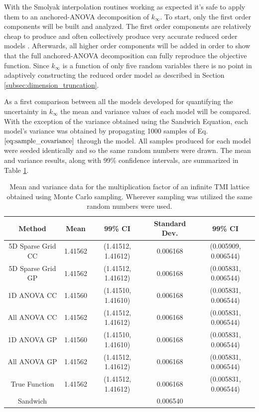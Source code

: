 With the Smolyak interpolation routines working as expected it's safe to apply them to an anchored-\ac{ANOVA} decomposition of $k_{\infty}$. To start, only the first order components will be built and analyzed. The first order components are relatively cheap to produce and often collectively produce very accurate reduced order models \cite{AHSGC_HighDimensions}. Afterwards, all higher order components will be added in order to show that the full anchored-\ac{ANOVA} decomposition can fully reproduce the objective function. Since $k_{\infty}$ is a function of only five random variables there is no point in adaptively constructing the reduced order model as described in Section \ref{subsec:dimension_truncation}.        

As a first comparison between all the models developed for quantifying the uncertainty in $k_{\infty}$ the mean and variance values of each model will be compared. With the exception of the variance obtained using the Sandwich Equation, each model's variance was obtained by propagating 1000 samples of Eq. $\ref{eq:sample_covariance}$ through the model. All samples produced for each model were seeded identically and so the same random numbers were drawn. The mean and variance results, along with 99\% confidence intervals, are summarized in Table \ref{table:kinf_mean_variance}. 
    
\begin{table} 
\caption{\label{table:kinf_mean_variance} 
Mean and variance data for the multiplication factor of an infinite TMI lattice obtained using Monte Carlo sampling. Wherever sampling was utilized the same random numbers were used.}
\centering
\small
\begin{tabular}{||c|c|c|c|c||} 
\hline \hline
\textbf{Method} & \textbf{Mean} & \textbf{99\% CI} & \textbf{Standard Dev.} & \textbf{99\% CI} \\ \hline
5D Sparse Grid CC      & 1.41562 & (1.41512, 1.41612) & 0.006168 & (0.005909, 0.006544) \\ \hline
5D Sparse Grid GP      & 1.41562 & (1.41512, 1.41612) & 0.006168 & (0.005831, 0.006544) \\ \hline
1D ANOVA CC  & 1.41560 & (1.41510, 1.41610) & 0.006168 & (0.005831, 0.006544) \\ \hline
All ANOVA CC & 1.41562 & (1.41512, 1.41612) & 0.006168 & (0.005831, 0.006544) \\ \hline
1D ANOVA GP  & 1.41560 & (1.41510, 1.41610) & 0.006168 & (0.005831, 0.006544) \\ \hline
All ANOVA GP & 1.41562 & (1.41512, 1.41612) & 0.006168 & (0.005831, 0.006544) \\ \hline
True Function & 1.41562 & (1.41512, 1.41612) & 0.006168 & (0.005831, 0.006544) \\ \hline
Sandwich               &         &                    & 0.006540 &                      \\
\hline \hline
\end{tabular}
\end{table}

